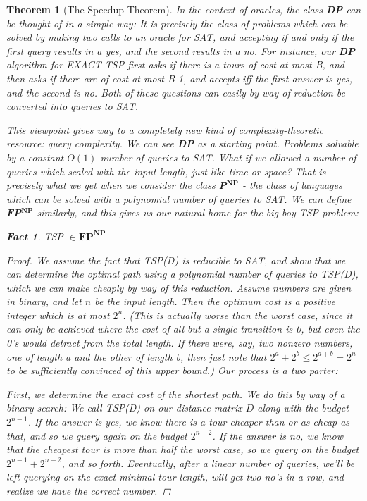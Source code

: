 \documentclass{article}
\theoremstyle{definition}
\theoremstyle{plain}
\theoremstyle{theorem}
\newtheorem{fact}{Fact}[section]
\newtheorem{theorem}{Theorem}[section]
\begin{document}
\begin{theorem}[The Speedup Theorem]
\par In the context of oracles, the class \textbf{DP} can be thought of in a simple way: It is precisely the class of problems which can be solved by making two calls to an oracle for SAT, and accepting if and only if the first query results in a yes, and the second results in a no. For instance, our \textbf{DP} algorithm for EXACT TSP first asks if there is a tours of cost at most B, and then asks if there are of cost at most B-1, and accepts iff the first answer is yes, and the second is no. Both of these questions can easily by way of reduction be converted into queries to SAT. 
\par This viewpoint gives way to a completely new kind of complexity-theoretic resource: \textit{query complexity}. We can see \textbf{DP} as a starting point. Problems solvable by a constant $O(1)$ number of queries to SAT. What if we allowed a number of queries which scaled with the input length, just like time or space? That is precisely what we get when we consider the class \textbf{P}$^{\textbf{NP}}$ - the class of languages which can be solved with a polynomial number of queries to SAT. We can define \textbf{FP}$^{\textbf{NP}}$ similarly, and this gives us our natural home for the big boy TSP problem:
\begin{fact}
    TSP $\in \textbf{FP}^{\textbf{NP}}$ 
\end{fact}
\begin{proof}
    We assume the fact that TSP(D) is reducible to SAT, and show that we can determine the optimal path using a polynomial number of queries to TSP(D), which we can make cheaply by way of this reduction. Assume numbers are given in binary, and let $n$ be the input length. Then the optimum cost is a positive integer which is at most $2^n$. (This is actually worse than the worst case, since it can only be achieved where the cost of all but a single transition is 0, but even the 0's would detract from the total length. If there were, say, two nonzero numbers, one of length a and the other of length b, then just note that $2^a + 2^b \leq 2^{a+b} = 2^n$ to be sufficiently convinced of this upper bound.) Our process is a two parter:
    \par First, we determine the exact cost of the shortest path. We do this by way of a binary search: We call TSP(D) on our distance matrix $D$ along with the budget $2^{n-1}$. If the answer is yes, we know there is a tour cheaper than or as cheap as that, and so we query again on the budget $2^{n-2}$. If the answer is no, we know that the cheapest tour is more than half the worst case, so we query on the budget $2^{n-1}+2^{n-2}$, and so forth. Eventually, after a linear number of queries, we'll be left querying on the exact minimal tour length, will get two no's in a row, and realize we have the correct number.

\end{proof}
\end{theorem}
\end{document}

